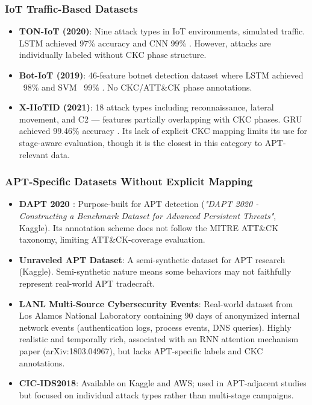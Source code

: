 \subsubsection{IoT Traffic-Based Datasets}

\begin{itemize}
\item \textbf{TON-IoT (2020)}: Nine attack types in IoT environments, simulated traffic. LSTM achieved 97\% accuracy and CNN 99\% \cite{ankalaki2025cyber}. However, attacks are individually labeled without CKC phase structure.
\item \textbf{Bot-IoT (2019)}: 46-feature botnet detection dataset where LSTM achieved ~98\% and SVM ~99\% \cite{ankalaki2025cyber}. No CKC/ATT\&CK phase annotations.
\item \textbf{X-IIoTID (2021)}: 18 attack types including reconnaissance, lateral movement, and C2 — features partially overlapping with CKC phases. GRU achieved 99.46\% accuracy \cite{ankalaki2025cyber}. Its lack of explicit CKC mapping limits its use for stage-aware evaluation, though it is the closest in this category to APT-relevant data.
\end{itemize}

\subsubsection{APT-Specific Datasets Without Explicit Mapping}

\begin{itemize}
\item \textbf{DAPT 2020 \cite{myneni2020dapt}}: Purpose-built for APT detection (\textit{"DAPT 2020 \cite{myneni2020dapt} - Constructing a Benchmark Dataset for Advanced Persistent Threats"}, Kaggle). Its annotation scheme does not follow the MITRE ATT\&CK taxonomy, limiting ATT\&CK-coverage evaluation.
\item \textbf{Unraveled \cite{myneni2023unraveled} APT Dataset}: A semi-synthetic dataset for APT research (Kaggle). Semi-synthetic nature means some behaviors may not faithfully represent real-world APT tradecraft.
\item \textbf{LANL Multi-Source Cybersecurity Events}: Real-world dataset from Los Alamos National Laboratory containing 90 days of anonymized internal network events (authentication logs, process events, DNS queries). Highly realistic and temporally rich, associated with an RNN attention mechanism paper (arXiv:1803.04967), but lacks APT-specific labels and CKC annotations.
\item \textbf{CIC-IDS2018}: Available on Kaggle and AWS; used in APT-adjacent studies but focused on individual attack types rather than multi-stage campaigns.
\end{itemize}

